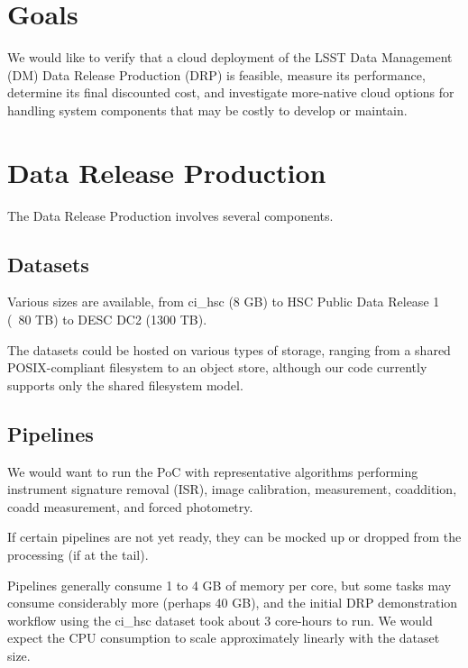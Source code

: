 \section{Goals} \label{sec:goals}
We would like to verify that a cloud deployment of the LSST Data Management (DM) Data Release Production (DRP) is feasible, measure its performance, determine its final discounted cost, and investigate more-native cloud options for handling system components that may be costly to develop or maintain.

\section{Data Release Production} \label{sec:drp}
The Data Release Production involves several components.

\subsection{Datasets} \label{sec:drp-datasets}
Various sizes are available, from ci\_hsc (8 GB) to HSC Public Data Release 1 (~80 TB) to DESC DC2 (1300 TB).

The datasets could be hosted on various types of storage, ranging from a shared POSIX-compliant filesystem to an object store, although our code currently supports only the shared filesystem model.

\subsection{Pipelines} \label{sec:drp-pipelines}
We would want to run the PoC with representative algorithms performing instrument signature removal (ISR), image calibration, measurement, coaddition, coadd measurement, and forced photometry.

If certain pipelines are not yet ready, they can be mocked up or dropped from the processing (if at the tail).

Pipelines generally consume 1 to 4 GB of memory per core, but some tasks may consume considerably more (perhaps 40 GB), and the initial DRP demonstration workflow using the ci\_hsc dataset took about 3 core-hours to run.
We would expect the CPU consumption to scale approximately linearly with the dataset size.

